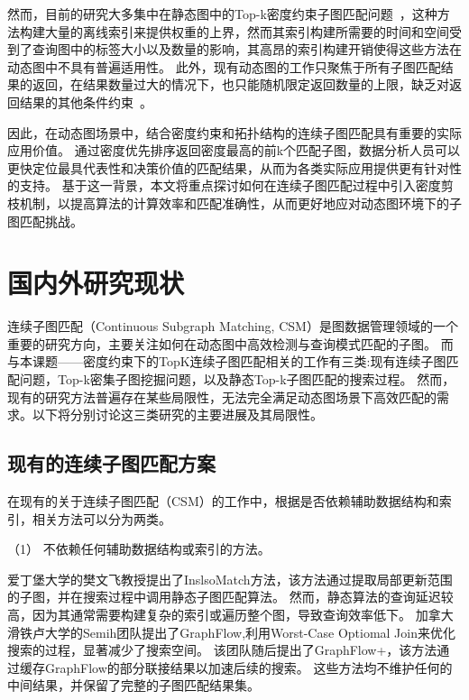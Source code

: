 然而，目前的研究大多集中在静态图中的Top-k密度约束子图匹配问题~\cite{density-define-DBLP:journals/vldb/AngelKSSST14,dsm-noweight-Bahmani-DBLP:journals/pvldb/BahmaniKV12}，这种方法构建大量的离线索引来提供权重的上界，然而其索引构建所需要的时间和空间受到了查询图中的标签大小以及数量的影响，其高昂的索引构建开销使得这些方法在动态图中不具有普遍适用性。
此外，现有动态图的工作只聚焦于所有子图匹配结果的返回，在结果数量过大的情况下，也只能随机限定返回数量的上限，缺乏对返回结果的其他条件约束~\cite{csm-sjtree-DBLP:conf/edbt/ChoudhuryHCAF15,csm-IncIsoMatch-DBLP:conf/sigmod/FanLLTWW11,dsm-noweight-Hu-DBLP:conf/cikm/HuWC17,csm-turboflux-DBLP:conf/sigmod/KimSHLHCSJ18,csm-graphflowpp-DBLP:journals/tods/MhedhbiKS21,csm-symbi-DBLP:journals/pvldb/MinPPGIH21,csm-rapidflow-DBLP:journals/pvldb/SunSHL22}。

因此，在动态图场景中，结合密度约束和拓扑结构的连续子图匹配具有重要的实际应用价值。
通过密度优先排序返回密度最高的前k个匹配子图，数据分析人员可以更快定位最具代表性和决策价值的匹配结果，从而为各类实际应用提供更有针对性的支持。
基于这一背景，本文将重点探讨如何在连续子图匹配过程中引入密度剪枝机制，以提高算法的计算效率和匹配准确性，从而更好地应对动态图环境下的子图匹配挑战。
\section{国内外研究现状}
连续子图匹配（Continuous Subgraph Matching, CSM）是图数据管理领域的一个重要的研究方向，主要关注如何在动态图中高效检测与查询模式匹配的子图。
而与本课题——密度约束下的TopK连续子图匹配相关的工作有三类:现有连续子图匹配问题，Top-k密集子图挖掘问题，以及静态Top-k子图匹配的搜索过程。
然而，现有的研究方法普遍存在某些局限性，无法完全满足动态图场景下高效匹配的需求。以下将分别讨论这三类研究的主要进展及其局限性。
\subsection{现有的连续子图匹配方案}
在现有的关于连续子图匹配（CSM）的工作\cite{csm-sjtree-DBLP:conf/edbt/ChoudhuryHCAF15,csm-IncIsoMatch-DBLP:conf/sigmod/FanLLTWW11,csm-graphflow-DBLP:conf/sigmod/KankanamgeSMCS17,csm-turboflux-DBLP:conf/sigmod/KimSHLHCSJ18,csm-graphflowpp-DBLP:journals/tods/MhedhbiKS21,csm-symbi-DBLP:journals/pvldb/MinPPGIH21,csm-rapidflow-DBLP:journals/pvldb/SunSHL22}中，根据是否依赖辅助数据结构和索引，相关方法可以分为两类。

（1） 不依赖任何辅助数据结构或索引的方法。

爱丁堡大学的樊文飞教授提出了InslsoMatch\cite{csm-IncIsoMatch-DBLP:conf/sigmod/FanLLTWW11}方法，该方法通过提取局部更新范围的子图，并在搜索过程中调用静态子图匹配算法。
然而，静态算法的查询延迟较高，因为其通常需要构建复杂的索引或遍历整个图，导致查询效率低下。
加拿大滑铁卢大学的Semih团队提出了GraphFlow\cite{csm-graphflow-DBLP:conf/sigmod/KankanamgeSMCS17},利用Worst-Case Optiomal Join来优化搜索的过程，显著减少了搜索空间。
该团队随后提出了GraphFlow+\cite{csm-graphflowpp-DBLP:journals/tods/MhedhbiKS21}，该方法通过缓存GraphFlow的部分联接结果以加速后续的搜索。
这些方法均不维护任何的中间结果，并保留了完整的子图匹配结果集。

